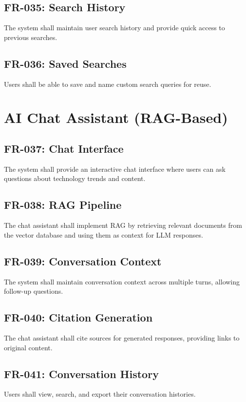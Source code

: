 \documentclass{report}
\begin{document}
\subsection{FR-035: Search History}
The system shall maintain user search history and provide quick access to previous searches.

\subsection{FR-036: Saved Searches}
Users shall be able to save and name custom search queries for reuse.

\section{AI Chat Assistant (RAG-Based)}

\subsection{FR-037: Chat Interface}
The system shall provide an interactive chat interface where users can ask questions about technology trends and content.

\subsection{FR-038: RAG Pipeline}
The chat assistant shall implement RAG by retrieving relevant documents from the vector database and using them as context for LLM responses.

\subsection{FR-039: Conversation Context}
The system shall maintain conversation context across multiple turns, allowing follow-up questions.

\subsection{FR-040: Citation Generation}
The chat assistant shall cite sources for generated responses, providing links to original content.

\subsection{FR-041: Conversation History}
Users shall view, search, and export their conversation histories.
\end{document}
